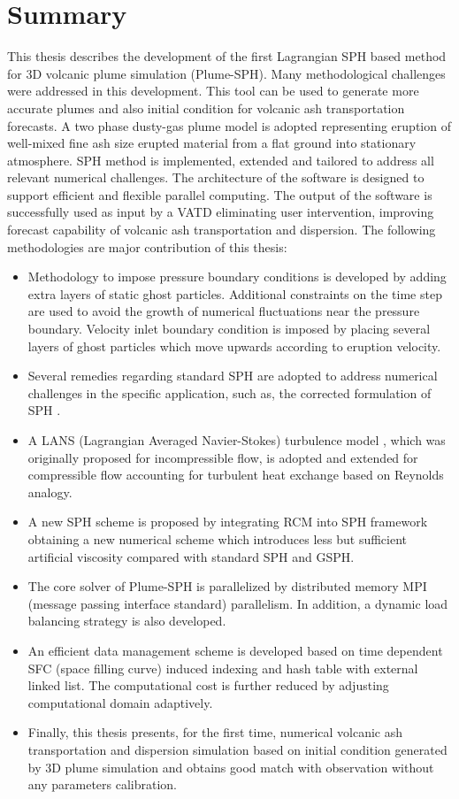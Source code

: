 \section{Summary}
This thesis describes  the development of the first Lagrangian SPH based method for 3D volcanic plume simulation  (Plume-SPH). Many methodological challenges were addressed in this development. This tool can be used to generate more accurate plumes and also initial condition for volcanic ash transportation forecasts. A two phase dusty-gas plume model is adopted representing eruption of well-mixed fine ash size erupted material from a flat ground into stationary atmosphere. SPH method is implemented, extended and tailored to address all relevant numerical challenges. The architecture of the software is designed to support efficient and flexible parallel computing. The output of the software is successfully used as input by a VATD eliminating user intervention, improving forecast capability of volcanic ash transportation and dispersion. The following methodologies are major contribution of this thesis:

\begin{itemize}
\item Methodology to impose pressure boundary conditions is developed by adding extra layers of static ghost particles. Additional constraints on the time step are used to avoid the growth of numerical fluctuations near the pressure boundary. Velocity inlet boundary condition is imposed by placing several layers of ghost particles which move upwards according to eruption velocity.
\item Several remedies regarding standard SPH are adopted to address numerical challenges in the specific application, such as, the corrected formulation of SPH \citep{chen1999improvement}.
\item  A LANS (Lagrangian Averaged Navier-Stokes) turbulence model \citep{monaghan2011turbulence}, which was originally proposed for incompressible flow, is adopted and extended for compressible flow accounting for turbulent heat exchange based on Reynolds analogy.
\item A new SPH scheme is proposed by integrating RCM into SPH framework obtaining a new numerical scheme which introduces less but sufficient artificial viscosity compared with standard SPH and GSPH.
\item The core solver of Plume-SPH is parallelized by distributed memory MPI (message passing interface standard) parallelism. In addition, a dynamic load balancing strategy is also developed. 
\item An efficient data management scheme is developed based on time dependent SFC (space filling curve) induced indexing and hash table with external linked list. The computational cost is further reduced by adjusting computational domain adaptively.
\item Finally, this thesis presents, for the first time, numerical volcanic ash transportation and dispersion simulation based on initial condition generated by 3D plume simulation and obtains good match with observation without any parameters calibration.
\end{itemize}

